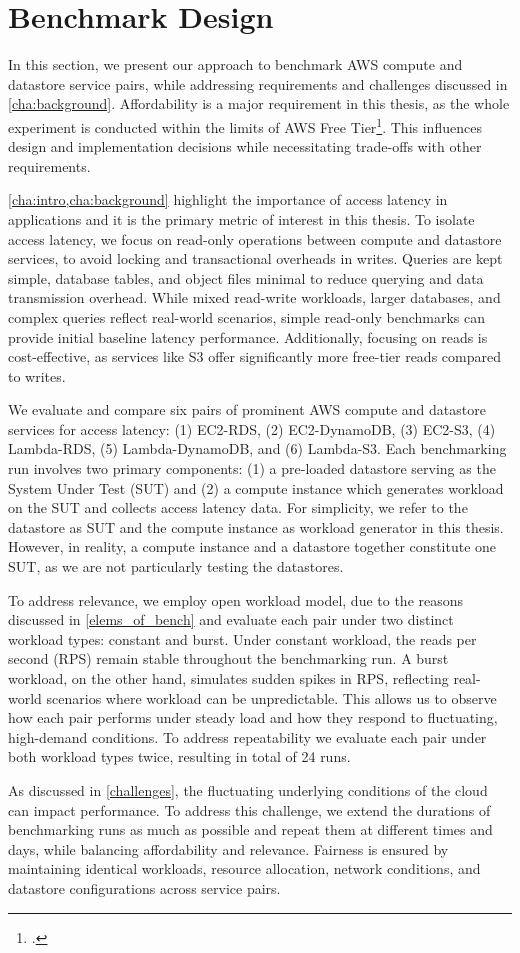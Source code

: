 \section{Benchmark Design}
\label{cha:approach}

In this section, we present our approach to benchmark AWS compute and datastore service pairs, while addressing requirements and challenges discussed in \cref{cha:background}. Affordability is a major requirement in this thesis, as the whole experiment is conducted within the limits of AWS Free Tier\footcite{https://aws.amazon.com/free/}. This influences design and implementation decisions while necessitating trade-offs with other requirements.

\cref{cha:intro,cha:background} highlight the importance of access latency in applications and it is the primary metric of interest in this thesis. To isolate access latency, we focus on read-only operations between compute and datastore services, to avoid locking and transactional overheads in writes. Queries are kept simple, database tables, and object files minimal to reduce querying and data transmission overhead. While mixed read-write workloads, larger databases, and complex queries reflect real-world scenarios, simple read-only benchmarks can provide initial baseline latency performance. Additionally, focusing on reads is cost-effective, as services like S3 offer significantly more free-tier reads compared to writes.

We evaluate and compare six pairs of prominent AWS compute and datastore services for access latency: (1) EC2-RDS, (2) EC2-DynamoDB, (3) EC2-S3, (4) Lambda-RDS, (5) Lambda-DynamoDB, and (6) Lambda-S3. Each benchmarking run involves two primary components: (1) a pre-loaded datastore serving as the System Under Test (SUT) and (2) a compute instance which generates workload on the SUT and collects access latency data. For simplicity, we refer to the datastore as SUT and the compute instance as workload generator in this thesis. However, in reality, a compute instance and a datastore together constitute one SUT, as we are not particularly testing the datastores.

To address relevance, we employ open workload model, due to the reasons discussed in \cref{elems_of_bench} and evaluate each pair under two distinct workload types: constant and burst. Under constant workload, the reads per second (RPS) remain stable throughout the benchmarking run. A burst workload, on the other hand, simulates sudden spikes in RPS, reflecting real-world scenarios where workload can be unpredictable. This allows us to observe how each pair performs under steady load and how they respond to fluctuating, high-demand conditions. To address repeatability we evaluate each pair under both workload types twice, resulting in total of 24 runs.

As discussed in \cref{challenges}, the fluctuating underlying conditions of the cloud can impact performance. To address this challenge, we extend the durations of benchmarking runs as much as possible and repeat them at different times and days, while balancing affordability and relevance. Fairness is ensured by maintaining identical workloads, resource allocation, network conditions, and datastore configurations across service pairs.
